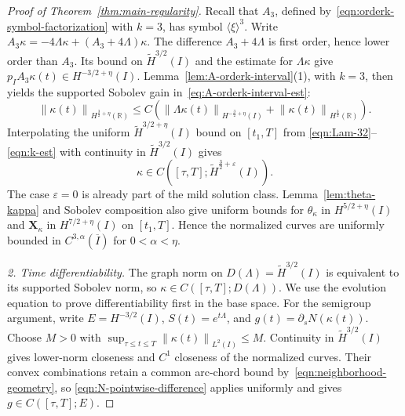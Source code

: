 \documentclass[11pt,reqno]{amsart}
\theoremstyle{plain}
\theoremstyle{definition}
\numberwithin{equation}{section}
\newcommand{\paren}[1]{\left(#1\right)}
\newcommand{\p}{\partial}
\newcommand{\wt}[1]{\widetilde{#1}}
\newcommand{\bm}[1]{\boldsymbol{#1}}
\newcommand{\norm}[1]{\left\lVert #1 \right\rVert}
\newcommand{\R}{\mathbb{R}}
\newcommand{\xk}{\bm X_\kappa}
\newcommand{\hi}[1]{H^{#1}(I)}
\newcommand{\thi}[1]{\wt H^{#1}(I)}
\newcommand{\hr}[1]{H^{#1}(\R)}
\begin{document}
\begin{proof}[Proof of Theorem~\ref{thm:main-regularity}]
Recall that $A_3$, defined by~\eqref{eqn:orderk-symbol-factorization} with $k=3$, has symbol
$\langle\xi\rangle^3$. Write
$A_3\kappa=-4\Lambda\kappa+(A_3+4\Lambda)\kappa$.
The difference $A_3+4\Lambda$ is first order, hence lower order than
$A_3$. Its bound on $\thi{3/2}$ and the estimate for $\Lambda\kappa$
give $p_I A_3\kappa(t)\in H^{-3/2+\eta}(I)$.
Lemma~\ref{lem:A-orderk-interval}(1), with $k=3$, then yields the
supported Sobolev gain in~\eqref{eq:A-orderk-interval-est}:
\begin{equation}\label{eqn:k-est}
    \norm{\kappa(t)}_{\hr{\frac32+\eta}}
    \le C\paren{
        \norm{\Lambda\kappa(t)}_{\hi{-\frac32+\eta}}
        +\norm{\kappa(t)}_{\hr{\frac32}}}.
\end{equation}
Interpolating the uniform $\thi{3/2+\eta}$ bound on $[t_1,T]$ from
\eqref{eqn:Lam-32}--\eqref{eqn:k-est} with continuity in $\thi{3/2}$ gives
\begin{equation}\label{eqn:reconstruction-positive-time-sobolev}
    \kappa\in C\paren{[\tau,T];\thi{\frac32+\varepsilon}}.
\end{equation}
The case $\varepsilon=0$ is already part of the mild solution class.
Lemma~\ref{lem:theta-kappa} and Sobolev composition also give uniform
bounds for $\theta_\kappa$ in $H^{5/2+\eta}(I)$ and $\xk$ in
$H^{7/2+\eta}(I)$ on $[t_1,T]$. Hence the normalized curves are
uniformly bounded in $C^{3,\alpha}(\overline I)$ for $0<\alpha<\eta$.

\emph{2. Time differentiability.}
The graph norm on $D(\Lambda)=\thi{3/2}$ is equivalent to its
supported Sobolev norm, so $\kappa\in C([\tau,T];D(\Lambda))$.
We use the evolution equation to prove differentiability first in the
base space. For the semigroup argument, write
$E=H^{-3/2}(I)$, $S(t)=e^{t\Lambda}$, and
$g(t)=\p_sN(\kappa(t))$.
Choose $M>0$ with $\sup_{\tau\le t\le T}\norm{\kappa(t)}_{L^2(I)}\le M$.
Continuity in $\thi{3/2}$ gives lower-norm closeness and $C^1$ closeness
of the normalized curves. Their convex combinations retain a common
arc-chord bound by~\eqref{eqn:neighborhood-geometry}, so
\eqref{eqn:N-pointwise-difference} applies uniformly and gives
$g\in C([\tau,T];E)$.


\end{proof}
\end{document}
